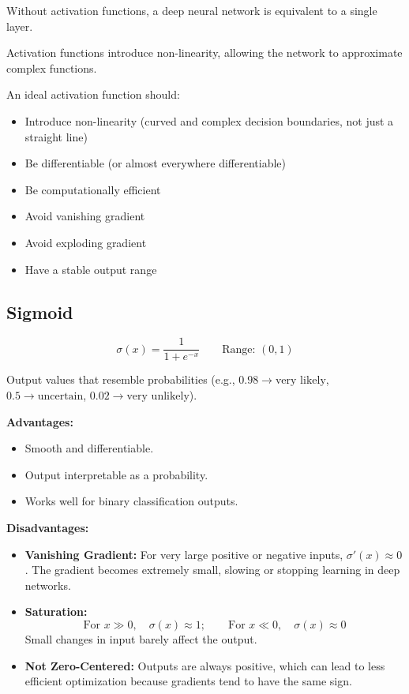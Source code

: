 Without activation functions, a deep neural network is equivalent to a single layer.

Activation functions introduce non-linearity, allowing the network to approximate complex functions.

An ideal activation function should:
\begin{itemize}
    \item Introduce non-linearity (curved and complex decision boundaries, not just a straight line)
    \item Be differentiable (or almost everywhere differentiable)
    \item Be computationally efficient
    \item Avoid vanishing gradient
    \item Avoid exploding gradient
    \item Have a stable output range
\end{itemize}

\subsection{Sigmoid}

\begin{equation}
\sigma(x) = \frac{1}{1 + e^{-x}} \qquad \text{Range: } (0, 1)
\end{equation}

\sigmoidplot

Output values that resemble probabilities (e.g., $0.98 \to \text{very likely}$, $0.5 \to \text{uncertain}$, $0.02 \to \text{very unlikely}$).

\begin{advbox}
\textbf{Advantages:}
\begin{itemize}
    \item Smooth and differentiable.
    \item Output interpretable as a probability.
    \item Works well for binary classification outputs.
\end{itemize}

\tcbline

\textbf{Disadvantages:}
\begin{itemize}
    \item \textbf{Vanishing Gradient:} For very large positive or negative inputs, $\sigma'(x) \approx 0$. The gradient becomes extremely small, slowing or stopping learning in deep networks.
    \item \textbf{Saturation:}
    \begin{equation}
    \text{For } x \gg 0, \quad \sigma(x) \approx 1; \qquad \text{For } x \ll 0, \quad \sigma(x) \approx 0
    \end{equation}
    Small changes in input barely affect the output.
    \item \textbf{Not Zero-Centered:} Outputs are always positive, which can lead to less efficient optimization because gradients tend to have the same sign.
\end{itemize}
\end{advbox}

